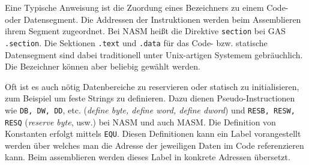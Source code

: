 Eine Typische Anweisung ist die Zuordung eines Bezeichners zu einem Code- oder
Datensegment. Die Addressen der Instruktionen werden beim Assemblieren ihrem
Segment zugeordnet. Bei NASM heißt die Direktive \texttt{section}
bei GAS \texttt{.section}. Die Sektionen \texttt{.text} und
\texttt{.data} für das Code- bzw. statische Datensegment sind dabei traditionell
unter Unix-artigen Systemem gebräuchlich. Die Bezeichner können aber 
beliebig gewählt werden.

Oft ist es auch nötig Datenbereiche zu reservieren oder statisch zu
initialisieren, zum Beispiel um feste Strings zu definieren. Dazu dienen
Pseudo-Instructionen wie \texttt{DB, DW, DD}, etc. (\emph{define byte, define
word, define dword}) und \texttt{RESB, RESW, RESQ} (\emph{reserve byte}, usw.)
bei NASM und auch MASM. Die Definition von Konstanten erfolgt mittels
\texttt{EQU}. Diesen Definitionen kann ein Label vorangestellt werden über
welches man die Adresse der jeweiligen Daten im Code referenzieren kann. Beim
assemblieren werden dieses Label in konkrete Adressen übersetzt.

